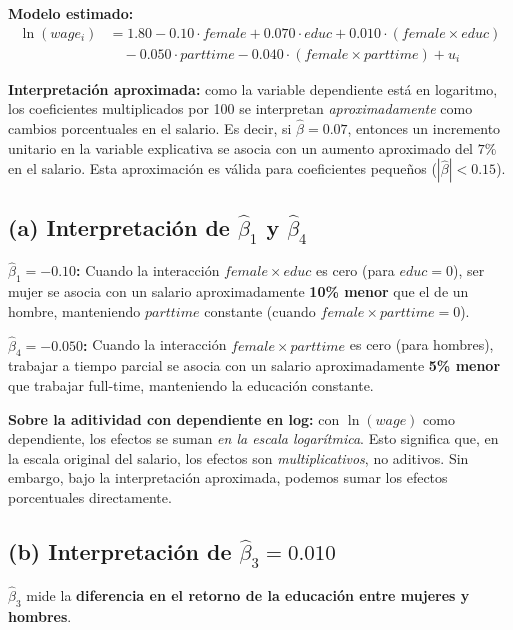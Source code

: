 \documentclass[11pt,a4paper]{article}
\begin{document}
\textbf{Modelo estimado:}
\begin{align*}
\ln(wage_i) &= 1.80 - 0.10 \cdot female + 0.070 \cdot educ + 0.010 \cdot (female \times educ) \\
&\quad - 0.050 \cdot parttime - 0.040 \cdot (female \times parttime) + u_i
\end{align*}

\begin{nota}
\textbf{Interpretación aproximada:} como la variable dependiente está en logaritmo, los coeficientes multiplicados por 100 se interpretan \emph{aproximadamente} como cambios porcentuales en el salario. Es decir, si \(\hat{\beta} = 0.07\), entonces un incremento unitario en la variable explicativa se asocia con un aumento aproximado del \(7\%\) en el salario. Esta aproximación es válida para coeficientes pequeños (\(|\hat{\beta}| < 0.15\)).
\end{nota}

\subsection*{(a) Interpretación de \(\hat{\beta}_1\) y \(\hat{\beta}_4\)}

\textbf{\(\hat{\beta}_1 = -0.10\):} Cuando la interacción \(female \times educ\) es cero (para \(educ=0\)), ser mujer se asocia con un salario aproximadamente \textbf{10\% menor} que el de un hombre, manteniendo \(parttime\) constante (cuando \(female \times parttime = 0\)).

\textbf{\(\hat{\beta}_4 = -0.050\):} Cuando la interacción \(female \times parttime\) es cero (para hombres), trabajar a tiempo parcial se asocia con un salario aproximadamente \textbf{5\% menor} que trabajar full-time, manteniendo la educación constante.

\textbf{Sobre la aditividad con dependiente en log:} con \(\ln(wage)\) como dependiente, los efectos se suman \emph{en la escala logarítmica}. Esto significa que, en la escala original del salario, los efectos son \emph{multiplicativos}, no aditivos. Sin embargo, bajo la interpretación aproximada, podemos sumar los efectos porcentuales directamente.

\subsection*{(b) Interpretación de \(\hat{\beta}_3 = 0.010\)}

\(\hat{\beta}_3\) mide la \textbf{diferencia en el retorno de la educación entre mujeres y hombres}.
\end{document}
